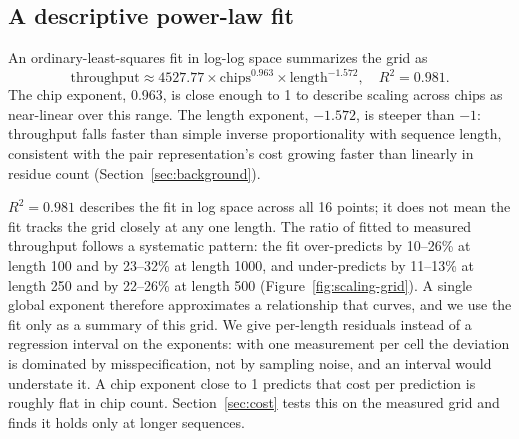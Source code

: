 \subsection{A descriptive power-law fit}
\label{sec:scaling-fit}

An ordinary-least-squares fit in log-log space summarizes the grid as
\begin{equation}
  \text{throughput} \approx 4527.77 \times \text{chips}^{0.963} \times \text{length}^{-1.572},
  \quad R^2 = 0.981.
  \label{eq:scaling-fit}
\end{equation}
The chip exponent, 0.963, is close enough to 1 to describe scaling
across chips as near-linear over this range. The length exponent,
$-1.572$, is steeper than $-1$: throughput falls faster than simple
inverse proportionality with sequence length, consistent with the
pair representation's cost growing faster than linearly in residue
count (Section~\ref{sec:background}).

$R^2 = 0.981$ describes the fit in log space across all 16 points; it
does not mean the fit tracks the grid closely at any one length.
The ratio of fitted to measured throughput follows a systematic
pattern: the fit over-predicts
by 10--26\% at length 100 and by 23--32\% at length 1000, and
under-predicts by 11--13\% at length 250 and by 22--26\% at length
500 (Figure~\ref{fig:scaling-grid}).
A single global exponent therefore approximates a relationship that
curves, and we use the fit only as a summary of this grid. We give
per-length residuals instead of a regression interval on the
exponents: with one measurement per cell the deviation is dominated by
misspecification, not by sampling noise, and an interval would
understate it. A chip exponent close to 1 predicts that cost per
prediction is roughly flat in chip count. Section~\ref{sec:cost} tests
this on the measured grid and finds it holds only at longer
sequences.

